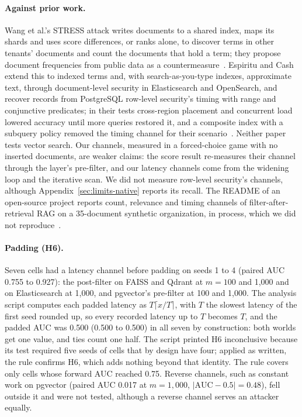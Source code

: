 \paragraph{Against prior work.}
Wang et al.'s STRESS attack writes documents to a shared index, maps its shards and uses score differences, or ranks alone, to discover terms in other tenants' documents and count the documents that hold a term; they propose document frequencies from public data as a countermeasure~\cite{wang2017sidechannel}. Espiritu and Cash extend this to indexed terms and, with search-as-you-type indexes, approximate text, through document-level security in Elasticsearch and OpenSearch, and recover records from PostgreSQL row-level security's timing with range and conjunctive predicates; in their tests cross-region placement and concurrent load lowered accuracy until more queries restored it, and a composite index with a subquery policy removed the timing channel for their scenario~\cite{espiritu2026plaintext}. Neither paper tests vector search. Our channels, measured in a forced-choice game with no inserted documents, are weaker claims: the score result re-measures their channel through the layer's pre-filter, and our latency channels come from the widening loop and the iterative scan. We did not measure row-level security's channels, although Appendix~\ref{sec:limits-native} reports its recall. The README of an open-source project reports count, relevance and timing channels of filter-after-retrieval RAG on a 35-document synthetic organization, in process, which we did not reproduce~\cite{raghuram2026onewayglass}.

\paragraph{Padding (H6).}
Seven cells had a latency channel before padding on seeds 1 to 4 (paired AUC 0.755 to 0.927): the
post-filter on FAISS and Qdrant at $m = 100$ and 1,000 and on Elasticsearch at 1,000, and pgvector's
pre-filter at 100 and 1,000. The analysis script computes each padded latency as $T \lceil x / T \rceil$, with $T$ the slowest latency of the first seed rounded up, so every recorded latency up to $T$ becomes $T$, and the padded AUC was
0.500 (0.500 to 0.500) in all seven by construction: both worlds get one value, and ties count one half. The script printed H6 inconclusive because its test required
five seeds of cells that by design have four; applied as written, the rule confirms H6, which adds nothing beyond that identity. The rule
covers only cells whose forward AUC reached 0.75. Reverse channels, such as constant work on pgvector
(paired AUC 0.017 at $m = 1{,}000$, $|\mathrm{AUC} - 0.5| = 0.48$), fell outside it and were not
tested, although a reverse channel serves an attacker equally.

